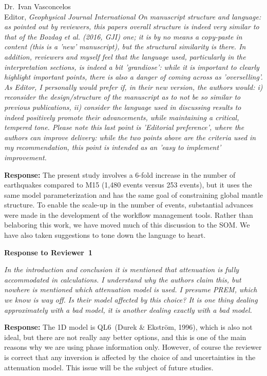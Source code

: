 \documentclass[11pt,a4paper]{letter}
\newcommand{\response}[1]{\textbf{Response:} #1}
\newcommand{\rev}[1]{{\it{#1}}}
\begin{document}
\begin{letter}{Dr.~Ivan Vasconcelos\\
Editor, \textit{Geophysical Journal International}}
\rev{On manuscript structure and language: as pointed out by reviewers, this papers overall structure is indeed very similar to that of the Bozdag et al. (2016, GJI) one; it is by no means a copy-paste in content (this is a 'new' manuscript), but the structural similarity is there. In addition, reviewers and myself feel that the language used, particularly in the interpretation sections, is indeed a bit 'grandiose': while it is important to clearly highlight important points, there is also a danger of coming across as 'overselling'. As Editor, I personally would prefer if, in their new version, the authors would: i) reconsider the design/structure of the manuscript as to not be so similar to previous publications, ii) consider the language used in discussing results to indeed positively promote their advancements, while maintaining a critical, tempered tone. Please note this last point is 'Editorial preference', where the authors can improve delivery: while the two points above are the criteria used in my recommendation, this point is intended as an 'easy to implement' improvement.
}

\response{The present study involves a 6-fold increase in the number of earthquakes compared to M15 (1,480 events versus 253 events), but it uses the same model parameterization and has the same goal of constraining global mantle structure.
To enable the scale-up in the number of events, substantial advances were made in the development of the workflow management tools.
Rather than belaboring this work, we have moved much of this discussion to the SOM.
We have also taken suggestions to tone down the language to heart.
}

{\textbf{\large{Response to Reviewer~1}}}

\rev{In the introduction and conclusion it is mentioned that attenuation is fully accommodated in calculations.
I understand why the authors claim this, but nowhere is mentioned which attenuation model is used. I presume PREM, which we know is way off.
Is their model affected by this choice?
It is one thing dealing approximately with a bad model, it is another dealing exactly with a bad model.
}

\response{The 1D model is QL6~(Durek \& Ekstr\"om, 1996), which is also not ideal, but there are not really any better options,
and this is one of the main reasons why we are using phase information only.
However,
of course the reviewer is correct that any inversion is affected by the choice of and uncertainties in the attenuation model. 
This issue will be the subject of future studies.
}


\end{letter}
\end{document}
